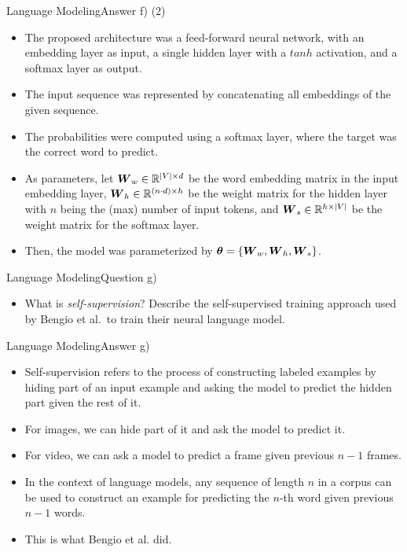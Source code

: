\documentclass[t]{beamer}
\begin{document}
\begin{frame}{Language Modeling}{Answer f) (2)}
    \begin{itemize}
        \item The proposed architecture was a feed-forward neural network, with
              an embedding layer as input, a single hidden layer with a $tanh$
              activation, and a softmax layer as output.
        \item The input sequence was represented by concatenating all embeddings
              of the given sequence.
        \item The probabilities were computed using a softmax layer, where the
              target was the correct word to predict.
        \item As parameters, let ${\boldsymbol{W}}_w\in \mathbb{R}^{|V|\times d}$ be the word
              embedding matrix in the input embedding layer,
              ${\boldsymbol{W}}_h\in\mathbb{R}^{(n\cdot d)\times h}$ be the weight matrix for the
              hidden layer with $n$ being the (max) number of input tokens,
              and ${\boldsymbol{W}}_s\in\mathbb{R}^{h\times |V|}$ be the weight matrix for the
              softmax layer.
        \item Then, the model was parameterized by
              ${\boldsymbol{\theta}} = \{{\boldsymbol{W}}_w, {\boldsymbol{W}}_h, {\boldsymbol{W}}_s\}$.
    \end{itemize}
\end{frame}

\begin{frame}{Language Modeling}{Question g)}
    \begin{itemize}
        \item What is \emph{self-supervision}? Describe the self-supervised
              training approach used by Bengio et al.\ to train their neural
              language model.
    \end{itemize}
\end{frame}

\begin{frame}{Language Modeling}{Answer g)}
    \begin{itemize}
        \item Self-supervision refers to the process of constructing labeled
              examples by hiding part of an input example and asking the model
              to predict the hidden part given the rest of it.
        \item For images, we can hide part of it and ask the model to predict
              it.
        \item For video, we can ask a model to predict a frame given previous
              $n-1$ frames.
        \item In the context of language models, any sequence of length $n$ in a
              corpus can be used to construct an example for predicting the
              $n$-th word given previous $n-1$ words.
        \item This is what Bengio et al. did.
    \end{itemize}
\end{frame}
\end{document}
